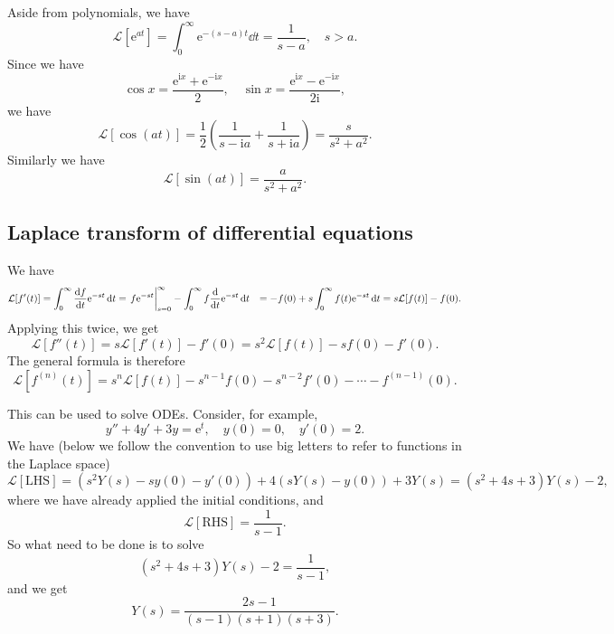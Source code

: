 \documentclass[hyperref, a4paper]{article}
\newcommand*{\ii}{\mathrm{i}}
\newcommand*{\ee}{\mathrm{e}}
\def\\{}%
\newcommand*{\laplace}{\mathcal{L}}
\newcommand*{\zerotoinf}{\int_{0}^{\infty}}
\begin{document}
Aside from polynomials, 
we have 
\begin{equation}
    \laplace[\ee^{at}] = \zerotoinf \ee^{-(s-a) t} \dd{t} = \frac{1}{s- a}, 
    \quad s > a. 
    \label{eq:eat-to-s-minus-a}
\end{equation}
Since we have 
\[
    \cos x = \frac{\ee^{\ii x} + \ee^{- \ii x}}{2}, \quad 
    \sin x = \frac{\ee^{\ii x} - \ee^{- \ii x}}{2 \ii}, 
\]
we have 
\begin{equation}
    \laplace[\cos (at)] = \frac{1}{2} \left(
        \frac{1}{s - \ii a} + \frac{1}{s + \ii a}
    \right) = \frac{s}{s^2 + a^2}.
\end{equation}
Similarly we have 
\begin{equation}
    \laplace[\sin(at)] = \frac{a}{s^2 + a^2}.
\end{equation}

\subsection{Laplace transform of differential equations}

We have 
\begin{equation}
    \begin{aligned}
        \laplace[f'(t)] &= \zerotoinf \dv{f}{t} \ee^{-st} \dd{t} 
        = \eval{f \ee^{-st}}_{s=0}^{\infty} 
        - \zerotoinf f \dv{t} \ee^{-st} \dd{t} \\ 
        &= - f(0) + s \zerotoinf f(t) \ee^{-st} \dd{t} 
        = s \laplace[f(t)] - f(0).
    \end{aligned}
\end{equation}
Applying this twice, we get 
\begin{equation}
    \laplace[f''(t)] = s \laplace[f'(t)] - f'(0) = s^2 \laplace[f(t)] - s f(0) - f'(0).
\end{equation}
The general formula is therefore 
\begin{equation}
    \laplace[f^{(n)}(t)] = s^n \laplace[f(t)] - s^{n-1} f(0) - s^{n-2} f'(0) - \cdots - f^{(n-1)}(0).
\end{equation}

This can be used to solve ODEs. 
Consider, for example, 
\begin{equation}
    y'' + 4y' + 3y = \ee^{t}, \quad 
    y(0) = 0, \quad y'(0) = 2.
\end{equation}
We have (below we follow the convention to use big letters to refer to functions in the Laplace space)
\[
    \laplace[\text{LHS}] = 
    (s^2 Y(s) - s y(0) - y'(0))
    + 4 (s Y(s) - y(0))
    + 3 Y(s) = 
    (s^2 + 4s + 3) Y(s) - 2,
\]
where we have already applied the initial conditions, 
and 
\[
    \laplace[\text{RHS}] = \frac{1}{s-1}.
\]
So what need to be done is to solve 
\[
    (s^2 + 4s + 3) Y(s) - 2 = \frac{1}{s - 1},
\]
and we get 
\begin{equation}
    Y(s) = \frac{2s-1}{(s-1) (s+1) (s+3)}.
\end{equation}
\end{document}
